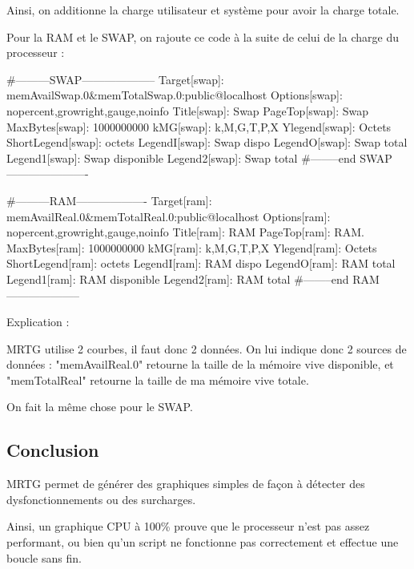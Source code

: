 Ainsi, on additionne la charge utilisateur et système pour avoir la charge totale.

Pour la RAM et le SWAP, on rajoute ce code à la suite de celui de la charge du processeur :

#---------SWAP--------------------
Target[swap]: memAvailSwap.0&memTotalSwap.0:public@localhost
Options[swap]: nopercent,growright,gauge,noinfo
Title[swap]: Swap
PageTop[swap]: Swap
MaxBytes[swap]: 1000000000
kMG[swap]: k,M,G,T,P,X
Ylegend[swap]: Octets
ShortLegend[swap]: octets
LegendI[swap]: Swap dispo
LegendO[swap]: Swap total
Legend1[swap]: Swap disponible
Legend2[swap]: Swap total
#--------end SWAP----------------------


#---------RAM-------------------
Target[ram]: memAvailReal.0&memTotalReal.0:public@localhost
Options[ram]: nopercent,growright,gauge,noinfo
Title[ram]: RAM
PageTop[ram]: RAM.
MaxBytes[ram]: 1000000000
kMG[ram]: k,M,G,T,P,X
Ylegend[ram]: Octets
ShortLegend[ram]: octets
LegendI[ram]: RAM dispo
LegendO[ram]: RAM total
Legend1[ram]: RAM disponible
Legend2[ram]: RAM total
#--------end RAM--------------------


Explication :

MRTG utilise 2 courbes, il faut donc 2 données. On lui indique donc 2 sources de données : "memAvailReal.0" retourne la taille de la mémoire vive disponible, et "memTotalReal" retourne la taille de ma mémoire vive totale.

On fait la même chose pour le SWAP.

\subsection{Conclusion}

MRTG permet de générer des graphiques simples de façon à détecter des dysfonctionnements ou des surcharges.

Ainsi, un graphique CPU à 100\% prouve que le processeur n'est pas assez performant, ou bien qu'un script ne fonctionne pas correctement et effectue une boucle sans fin.


